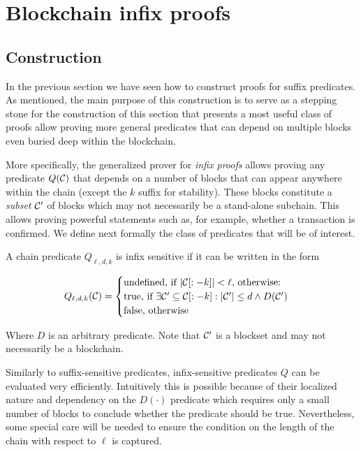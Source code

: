 \section{Blockchain infix proofs}
\label{sec:infix}

\subsection{Construction}

In the previous section we have seen how to construct proofs for suffix
predicates. As mentioned, the main purpose of this construction is to serve as a
stepping stone for the construction of this section that presents a most useful
class of proofs allow proving more general predicates that can depend on
multiple blocks even buried deep within the blockchain.

More specifically, the generalized prover for \textit{infix proofs} allows
proving any predicate $Q(\mathcal{C})$ that depends on a number of blocks that can
appear anywhere within the chain (except the $k$ suffix for stability). These
blocks constitute a \textit{subset} $\mathcal{C}'$ of blocks which may not
necessarily be a stand-alone subchain. This allows proving powerful statements
such as, for example, whether a transaction is confirmed. We define next
formally the class of predicates that will be of interest.

\begin{definition}
\label{def:infix}
A chain predicate $Q_{\ell,d,k}$ is \textnormal{infix sensitive} if it can be
written in the form

$$
Q_{\ell,d,k}(\mathcal{C}) =
\begin{cases}
  \text{undefined, if } |\mathcal{C}[:-k]| < \ell \text{, otherwise:}\\
  \text{true, if }
    \exists \mathcal{C}' \subseteq \mathcal{C}[:-k]: |\mathcal{C}'| \leq d \land D(\mathcal{C}')\\
  \text{false, otherwise}
\end{cases}
$$

Where $D$ is an arbitrary predicate. Note that $\mathcal{C}'$ is a blockset and may
not necessarily be a blockchain.
\end{definition}

Similarly to suffix-sensitive predicates, infix-sensitive predicates $Q$ can be
evaluated very efficiently. Intuitively this is possible because of their
localized nature and dependency on the $D(\cdot)$ predicate which requires only
a small number of blocks to conclude whether the predicate should be true.
Nevertheless, some special care will be needed to ensure the condition on the
length  of the chain with respect to $\ell$ is captured.

